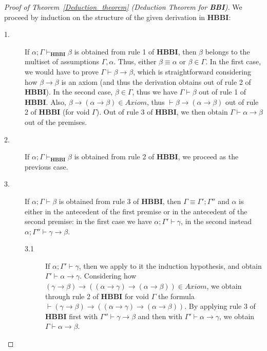 \documentclass[a4paper]{article}
\newcommand{\BBI}{\textbf{BBI}\xspace}
\begin{document}
\begin{proof}[Proof of Theorem~\ref{Deduction_theorem} (Deduction Theorem for \BBI)]
    We proceed by induction on the structure of the given derivation in \textbf{HBBI}:

    \begin{description}
        \item[1.] If $\alpha; \Gamma \vdash_{\textbf{HBBI}} \beta$ is obtained from rule 1 of \textbf{HBBI}, then $\beta$ belongs to the multiset of assumptions $\Gamma, \alpha$. Thus, either $\beta \equiv \alpha$ or $\beta \in \Gamma$. In the first case, we would have to prove $\Gamma \vdash \beta \rightarrow \beta$, which is straightforward considering how $\beta \rightarrow \beta$ is an axiom (and thus the derivation obtains out of rule 2 of \textbf{HBBI}). In the second case, $\beta \in \Gamma$, thus we have $\Gamma \vdash \beta$ out of rule 1 of \textbf{HBBI}. Also, $\beta \rightarrow (\alpha \rightarrow \beta) \in Axiom$, thus $\vdash \beta \rightarrow (\alpha \rightarrow \beta)$ out of rule 2 of \textbf{HBBI} (for void $\Gamma$). Out of rule 3 of \textbf{HBBI}, we then obtain $\Gamma \vdash \alpha \rightarrow \beta$ out of the premises.

        \item[2.] If $\alpha; \Gamma \vdash_{\textbf{HBBI}} \beta$ is obtained from rule 2 of \textbf{HBBI}, we proceed as the previous case.

        \item[3.] If $\alpha; \Gamma \vdash \beta$ is obtained from rule 3 of \textbf{HBBI}, then $\Gamma \equiv \Gamma'; \Gamma''$ and $\alpha$ is either in the antecedent of the first premise or in the antecedent of the second premise: in the first case we have $\alpha;\Gamma' \vdash \gamma$, in the second instead $\alpha;\Gamma'' \vdash \gamma \rightarrow \beta$.
\begin{description}
    \item[3.1] If $\alpha;\Gamma' \vdash \gamma$, then we apply to it the induction hypothesis, and obtain $\Gamma' \vdash \alpha \rightarrow \gamma$. Considering how $(\gamma \rightarrow \beta)\rightarrow((\alpha \rightarrow \gamma) \rightarrow (\alpha \rightarrow \beta)) \in Axiom$, we obtain through rule 2 of \textbf{HBBI} for void $\Gamma$ the formula $\vdash(\gamma \rightarrow \beta) \rightarrow ((\alpha \rightarrow \gamma)\rightarrow(\alpha \rightarrow \beta))$. By applying rule 3 of \textbf{HBBI} first with $\Gamma'' \vdash \gamma \rightarrow \beta$ and then with $\Gamma' \vdash \alpha \rightarrow \gamma$, we obtain $\Gamma \vdash \alpha \rightarrow \beta$.


\end{description}
\end{description}
\end{proof}
\end{document}
